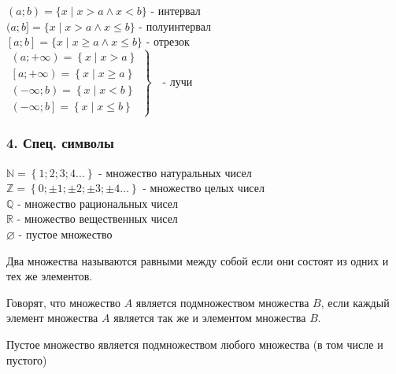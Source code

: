 $(a; b) = \{x \mid x > a \land x < b \}$ - интервал \\
$(a; b] = \{x \mid x > a \land x \le b \}$ - полуинтервал \\
$[a; b] = \{x \mid x \ge a \land x \le b \}$ - отрезок \\

$
\left.
\begin{array}{l}
	\left( a; +\infty \right) = \left\{x \mid x > a \right\} \\
	\left[ a; +\infty \right) = \left\{x \mid x \ge a \right\} \\
	\left( -\infty; b \right) = \left\{x \mid x < b \right\} \\
	\left( -\infty; b \right] = \left\{x \mid x \le b \right\}
\end{array}
\right\} \quad \text{- лучи }
$

\subsubsection{4. Спец. символы}

$\mathbb{N} = \left\{ 1; 2; 3; 4 \dots \right\}$ - множество натуральных чисел \\
$\mathbb{Z} = \left\{ 0; \pm 1; \pm 2; \pm 3; \pm 4 \dots \right\}$ - множество целых чисел \\
$\mathbb{Q}$ - множество рациональных чисел \\
$\mathbb{R}$ - множество вещественных чисел \\ 
$\varnothing$ - пустое множество

\begin{definition}
	Два множества называются равными между собой если они состоят из одних и тех же элементов.
\end{definition}

\begin{definition}[Подмножество]
	Говорят, что множество $A$ является подмножеством множества $B$, если каждый элемент множества $A$ является так же и элементом множества $B$.
\end{definition}

\begin{remark}
	Пустое множество является подмножеством любого множества (в том числе и пустого)
\end{remark}

